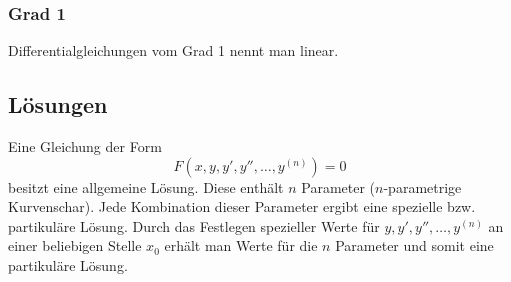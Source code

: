 \subsubsection{Grad 1}
Differentialgleichungen vom Grad 1 nennt man linear. 

\subsection{Lösungen}
Eine Gleichung der Form
\[ F(x, y, y', y'', \ldots, y^{(n)})=0 \]
besitzt eine allgemeine Lösung. Diese enthält $n$ Parameter ($n$-parametrige 
Kurvenschar). Jede Kombination dieser Parameter ergibt eine spezielle bzw. 
partikuläre Lösung. Durch das Festlegen spezieller Werte für 
$y, y', y'', \ldots, y^{(n)}$ an einer beliebigen Stelle $x_0$ erhält man Werte 
für die $n$ Parameter und somit eine partikuläre Lösung. 
